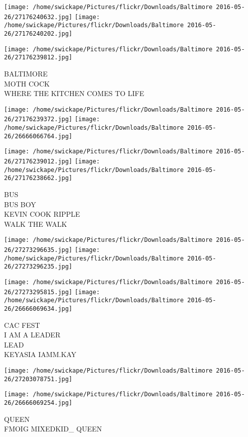 \documentclass[10pt,letterpaper]{article}
\begin{document}
\texttt{[image: /home/swickape/Pictures/flickr/Downloads/Baltimore 2016-05-26/27176240632.jpg]}
\texttt{[image: /home/swickape/Pictures/flickr/Downloads/Baltimore 2016-05-26/27176240202.jpg]}

\vspace{0.25in}
\texttt{[image: /home/swickape/Pictures/flickr/Downloads/Baltimore 2016-05-26/27176239812.jpg]}

BALTIMORE\\
MOTH COCK\\
WHERE THE KITCHEN COMES TO LIFE
\pagebreak

\texttt{[image: /home/swickape/Pictures/flickr/Downloads/Baltimore 2016-05-26/27176239372.jpg]}
\texttt{[image: /home/swickape/Pictures/flickr/Downloads/Baltimore 2016-05-26/26666066764.jpg]}

\texttt{[image: /home/swickape/Pictures/flickr/Downloads/Baltimore 2016-05-26/27176239012.jpg]}
\texttt{[image: /home/swickape/Pictures/flickr/Downloads/Baltimore 2016-05-26/27176238662.jpg]}

BUS\\
BUS BOY\\
KEVIN COOK RIPPLE\\
WALK THE WALK
\pagebreak

\texttt{[image: /home/swickape/Pictures/flickr/Downloads/Baltimore 2016-05-26/27273296635.jpg]}
\texttt{[image: /home/swickape/Pictures/flickr/Downloads/Baltimore 2016-05-26/27273296235.jpg]}

\texttt{[image: /home/swickape/Pictures/flickr/Downloads/Baltimore 2016-05-26/27273295815.jpg]}
\texttt{[image: /home/swickape/Pictures/flickr/Downloads/Baltimore 2016-05-26/26666069634.jpg]}

CAC FEST\\
I AM A LEADER\\
LEAD\\
KEYASIA IAMM.KAY
\pagebreak

\texttt{[image: /home/swickape/Pictures/flickr/Downloads/Baltimore 2016-05-26/27203078751.jpg]}

\vspace{0.25in}
\texttt{[image: /home/swickape/Pictures/flickr/Downloads/Baltimore 2016-05-26/26666069254.jpg]}

QUEEN\\
FMOIG MIXEDKID\_ QUEEN
\pagebreak
\end{document}
